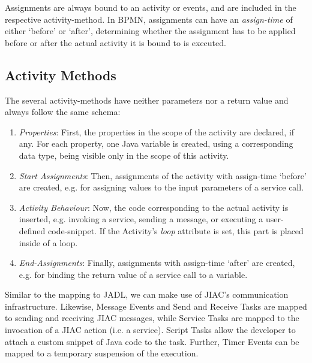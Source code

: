 Assignments are always bound to an activity or events, and are included in the
respective activity-method.  In BPMN, assignments can have an \emph{assign-time}
of either `before' or `after', determining whether the assignment has to be
applied before or after the actual activity it is bound to is executed.



\subsection{Activity Methods}

The several activity-methods have neither parameters nor a return value and always
follow the same schema:

\begin{enumerate}
	\item \emph{Properties}: First, the properties in the scope of the activity
	are declared, if any.  For each property, one Java variable is created,
	using a corresponding data type, being visible only in the scope of this
	activity.
	
	\item \emph{Start Assignments}: Then, assignments of the activity with
	assign-time `before' are created, e.g. for assigning values to the input
	parameters of a service call.
	
	\item \emph{Activity Behaviour}: Now, the code corresponding to the actual
	activity is inserted, e.g. invoking a service, sending a message, or executing
	a user-defined code-snippet.  If the Activity's \emph{loop} attribute is set,
	this part is placed inside of a loop.
	
	\item \emph{End-Assignments}: Finally, assignments with assign-time `after'
	are created, e.g. for binding the return value of a service call to a variable.
\end{enumerate}

Similar to the mapping to JADL, we can make use of JIAC's communication
infrastructure.  Likewise, Message Events and Send and Receive Tasks are mapped
to sending and receiving JIAC messages, while Service Tasks are mapped to the
invocation of a JIAC action (i.e. a service).  Script Tasks allow the developer
to attach a custom snippet of Java code to the task.  Further, Timer Events can
be mapped to a temporary suspension of the execution.

